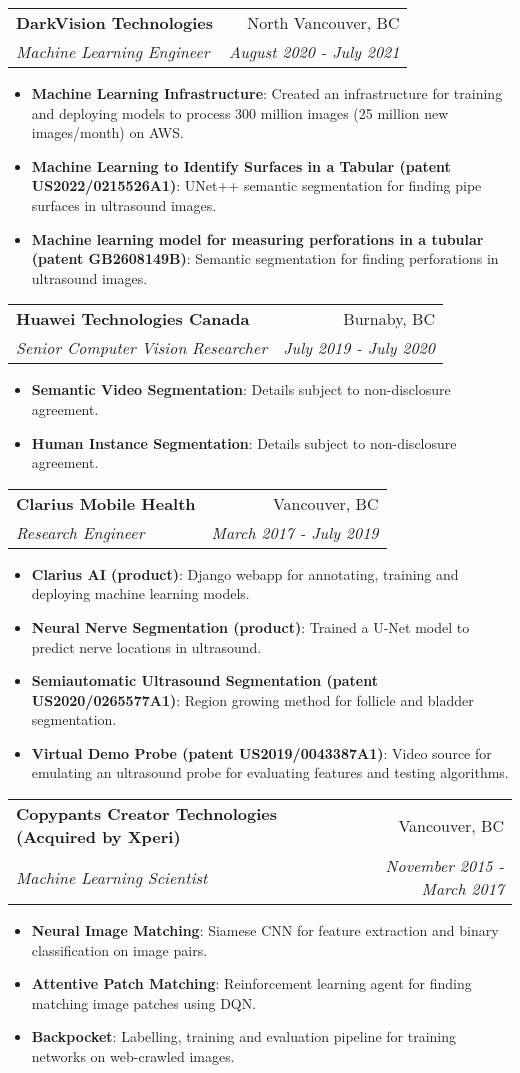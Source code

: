 \documentclass[letterpaper,11pt]{article}
\makeatletter
\newcommand{\resumeItem}[2]{
  \item\small{
    \textbf{#1}{: #2 \vspace{-2pt}}
  }
}
\newcommand{\resumeSubheading}[4]{
  \vspace{-1pt}\item
    \begin{tabular*}{0.97\textwidth}[t]{l@{\extracolsep{\fill}}r}
      \textbf{#1} & #2 \\
      \textit{\small#3} & \textit{\small #4} \\
    \end{tabular*}\vspace{-5pt}
}
\newcommand{\resumeItemListStart}{\begin{itemize}}
\newcommand{\resumeItemListEnd}{\end{itemize}\vspace{-5pt}}
\makeatother
\begin{document}
  \resumeSubheading
    {DarkVision Technologies}{North Vancouver, BC}
    {Machine Learning Engineer}{August 2020 - July 2021}
    \resumeItemListStart
      \resumeItem{Machine Learning Infrastructure}{Created an infrastructure for training and deploying models to process 300 million images (25 million new images/month) on AWS. }
      \resumeItem{Machine Learning to Identify Surfaces in a Tabular (patent US2022/0215526A1)}{UNet++ semantic segmentation for finding pipe surfaces in ultrasound images.}
      \resumeItem{Machine learning model for measuring perforations in a tubular (patent GB2608149B)}{Semantic segmentation for finding perforations in ultrasound images.}
    \resumeItemListEnd

  \resumeSubheading
    {Huawei Technologies Canada}{Burnaby, BC}
    {Senior Computer Vision Researcher}{July 2019 - July 2020}
    \resumeItemListStart
      \resumeItem{Semantic Video Segmentation}{Details subject to non-disclosure agreement.}
      \resumeItem{Human Instance Segmentation}{Details subject to non-disclosure agreement.}
    \resumeItemListEnd

    \resumeSubheading
      {Clarius Mobile Health}{Vancouver, BC}
      {Research Engineer}{March 2017 - July 2019}
      \resumeItemListStart
        \resumeItem{Clarius AI (product)}
          {Django webapp for annotating, training and deploying machine learning models.}
        \resumeItem{Neural Nerve Segmentation (product)}
            {Trained a U-Net model to predict nerve locations in ultrasound.}
        \resumeItem{Semiautomatic Ultrasound Segmentation (patent US2020/0265577A1)}
          {Region growing method for follicle and bladder segmentation.}
        \resumeItem{Virtual Demo Probe (patent US2019/0043387A1)}
          {Video source for emulating an ultrasound probe for evaluating features and testing algorithms.}
      \resumeItemListEnd

    \resumeSubheading
      {Copypants Creator Technologies (Acquired by Xperi)}{Vancouver, BC}
      {Machine Learning Scientist}{November 2015 - March 2017}
      \resumeItemListStart
        \resumeItem{Neural Image Matching}
          {Siamese CNN for feature extraction and binary classification on image pairs.}
        \resumeItem{Attentive Patch Matching}
          {Reinforcement learning agent for finding matching image patches using DQN.}
        \resumeItem{Backpocket}
          {Labelling, training and evaluation pipeline for training networks on web-crawled images.}
      \resumeItemListEnd
\end{document}
